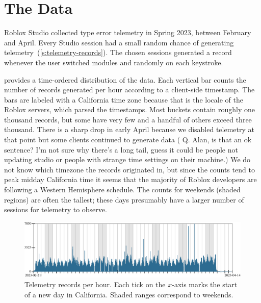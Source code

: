 \documentclass[english,submission,cleveref]{programming}
\begin{document}

\section{The Data}
\label{s:data}

Roblox Studio collected type error telemetry in Spring 2023,
between February and April.
Every Studio session had a small random chance of generating
telemetry~(\cref{s:telemetry-records}).
The chosen sessions generated a record whenever the user switched modules and
randomly on each keystroke.

 provides a time-ordered distribution of the data.
Each vertical bar counts the number of records generated per hour according to
a client-side timestamp.
The bars are labeled with a California time zone because that is the locale of
the Roblox servers, which parsed the timestamps.
Most buckets contain roughly one thousand records, but some have very few
and a handful of others exceed three thousand.
There is a sharp drop in early April because we disabled telemetry at that point
but some clients continued to generate data
(\FILL{} Q. Alan, is that an ok sentence? I'm not sure why there's a long tail,
guess it could be people not updating studio or people with strange time settings
on their machine.)
We do not know which timezone the records originated in, but since the counts
tend to peak midday California time it seems that the majority
of Roblox developers are following a Western Hemisphere schedule.
The counts for weekends (shaded regions) are often the tallest; these days presumably
have a larger number of sessions for telemetry to observe.

\begin{figure}[t]
  \includegraphics[width=\columnwidth]{img/row-distribution.pdf}
  \caption{Telemetry records per hour. Each tick on the $x$-axis marks the start of a new day in California. Shaded ranges correspond to weekends.}
  \label{f:records-per-hour}
\end{figure}
\end{document}
